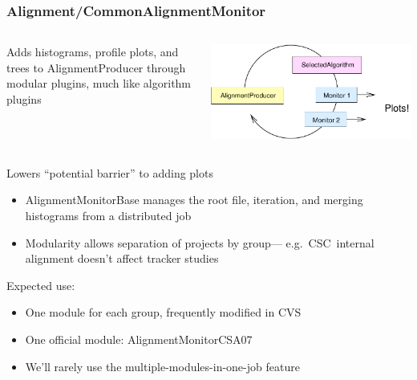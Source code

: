 \documentclass[compress]{beamer}
\begin{document}
\begin{frame}
\frametitle{Alignment/CommonAlignmentMonitor}
\begin{columns}

Adds histograms, profile plots, and trees to AlignmentProducer
through modular plugins, much like algorithm plugins

\includegraphics[width=\linewidth]{organization}
\end{columns}

\vfill
Lowers ``potential barrier'' to adding plots
\begin{itemize}
\item AlignmentMonitorBase manages the root file, iteration, and
merging histograms from a distributed job
\item Modularity allows separation of projects by group--- e.g.~CSC~internal alignment doesn't affect tracker studies
\end{itemize}
Expected use:
\begin{itemize}
\item One module for each group, frequently modified in CVS
\item One official module: AlignmentMonitorCSA07
\item We'll rarely use the multiple-modules-in-one-job feature
\end{itemize}
\end{frame}
\end{document}
